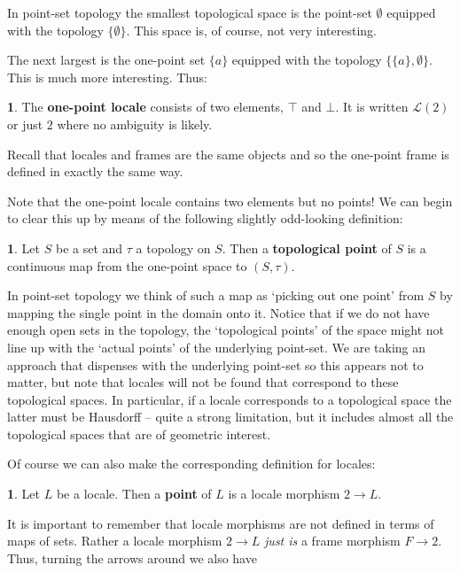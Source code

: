 \documentclass[oneside,english]{amsbook}
\numberwithin{section}{chapter}
\theoremstyle{plain}
\theoremstyle{definition}
\newtheorem{defn}[thm]{\protect\definitionname}
\providecommand{\definitionname}{Definition}
\begin{document}
In point-set topology the smallest topological space is the point-set $\emptyset$ equipped with the topology $\{\emptyset\}$. This space is, of course, not very interesting. 

The next largest is the one-point set $\{a\}$ equipped with the topology $\{\{a\}, \emptyset\}$. This is much more interesting. Thus:

\begin{defn}
	The \textbf{one-point locale} consists of two elements, $\top$ and $\bot$. It is written $\mathscr{L}(2)$ or just $2$ where no ambiguity is likely.
\end{defn}

Recall that locales and frames are the same objects and so the one-point frame is defined in exactly the same way.

Note that the one-point locale contains two elements but no points! We can begin to clear this up by means of the following slightly odd-looking definition:

\begin{defn}
	Let $S$ be a set and $\tau$ a topology on $S$. Then a \textbf{topological point} of $S$ is a continuous map from the one-point space to $(S, \tau)$.
\end{defn}

In point-set topology we think of such a map as `picking out one point' from $S$ by mapping the single point in the domain onto it. Notice that if we do not have enough open sets in the topology, the `topological points' of the space might not line up with the `actual points' of the underlying point-set. We are taking an approach that dispenses with the underlying point-set so this appears not to matter, but note that locales will not be found that correspond to these topological spaces. In particular, if a locale corresponds to a topological space the latter must be Hausdorff -- quite a strong limitation, but it includes almost all the topological spaces that are of geometric interest.

Of course we can also make the corresponding definition for locales:

\begin{defn}
	Let $L$ be a locale. Then a \textbf{point} of $L$ is a locale morphism $2\to L$.
\end{defn}

It is important to remember that locale morphisms are not defined in terms of maps of sets. Rather a locale morphism $2\to L$ \emph{just is} a frame morphism $F \to 2$. Thus, turning the arrows around we also have
\end{document}
